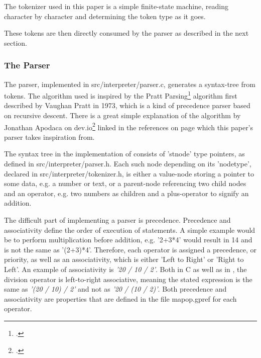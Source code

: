 \documentclass[12pt,a4paper,man]{apa7}
\begin{document}
The tokenizer used in this paper is a simple finite-state machine, reading
character by character and determining the token type as it goes.

These tokens are then directly consumed by the parser as described in the next
section.

\subsubsection{The Parser}
The parser, implemented in src/interpreter/parser.c, generates a syntax-tree
from tokens. The algorithm used is inspired by the Pratt Parsing\footcite{pratt}
algorithm first described by Vaughan Pratt in 1973, which is a kind of precedence
parser based on recursive descent. There is a great simple explanation of the algorithm
by Jonathan Apodaca on dev.io\footcite{devio} linked in the references on page 
\pageref{bibliography} which this paper's parser takes inspiration from.

The syntax tree in the implementation of \name consists of 'stnode' type
pointers, as defined in src/interpreter/parser.h. Each such node depending
on its 'nodetype', declared in src/interpreter/tokenizer.h,
is either a value-node storing a pointer to some data, e.g. a number or text, or a
parent-node referencing two child nodes and an operator, e.g. two numbers as
children and a plus-operator to signify an addition.

The difficult part of implementing a parser is precedence. Precedence and
associativity define the order of execution of statements. A simple example
would be to perform multiplication before addition, e.g. '2+3*4' would
result in 14 and is not the same as '(2+3)*4'. Therefore, each operator is
assigned a precedence, or priority, as well as an associativity, which is
either 'Left to Right' or 'Right to Left'. An example of associativity is
\emph{'20 / 10 / 2'}. Both in C as well as in \name, the division operator is
left-to-right associative, meaning the stated expression is the same as
\emph{'(20 / 10) / 2'} and not as \emph{'20 / (10 / 2)'}. Both precedence 
and associativity are properties that are defined in the file mapop.gpref for
each operator.
\end{document}
